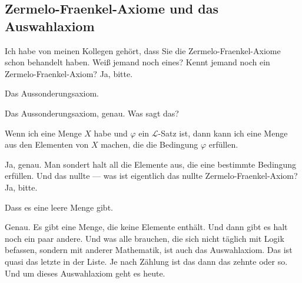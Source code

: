 \subsection{Zermelo-Fraenkel-Axiome und das Auswahlaxiom}

\begin{spoken-clean}[00:03:40 - 00:04:46]
Ich habe von meinen Kollegen gehört, dass Sie die Zermelo-Fraenkel-Axiome schon behandelt haben. Weiß jemand noch eines? Kennt jemand noch ein Zermelo-Fraenkel-Axiom? Ja, bitte.
\end{spoken-clean}

\begin{student-interaction}[Studentenantwort]
Das Aussonderungsaxiom.
\end{student-interaction}

\begin{spoken-clean}[continued]
Das Aussonderungsaxiom, genau. Was sagt das?
\end{spoken-clean}

\begin{student-interaction}[Studentenantwort]
Wenn ich eine Menge $X$ habe und $\varphi$ ein $\mathcal{L}$-Satz ist, dann kann ich eine Menge aus den Elementen von $X$ machen, die die Bedingung $\varphi$ erfüllen.
\end{student-interaction}

\begin{spoken-clean}[continued]
Ja, genau. Man sondert halt all die Elemente aus, die eine bestimmte Bedingung erfüllen. Und das nullte --- was ist eigentlich das nullte Zermelo-Fraenkel-Axiom? Ja, bitte.
\end{spoken-clean}

\begin{student-interaction}[Studentenantwort]
Dass es eine leere Menge gibt.
\end{student-interaction}

\begin{spoken-clean}[continued]
Genau. Es gibt eine Menge, die keine Elemente enthält. Und dann gibt es halt noch ein paar andere. Und was alle brauchen, die sich nicht täglich mit Logik befassen, sondern mit anderer Mathematik, ist auch das Auswahlaxiom. Das ist quasi das letzte in der Liste. Je nach Zählung ist das dann das zehnte oder so. Und um dieses Auswahlaxiom geht es heute.
\end{spoken-clean}

